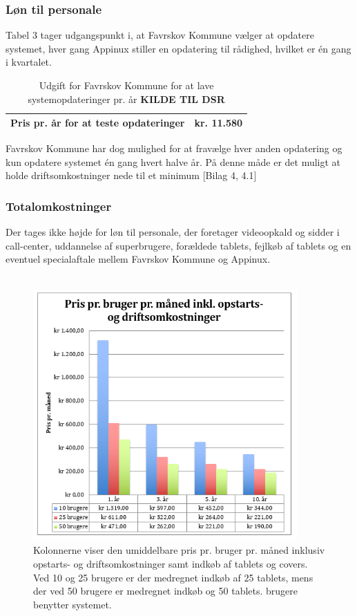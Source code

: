 \subsubsection{Løn til personale}
Tabel 3 tager udgangspunkt i, at Favrskov Kommune vælger at opdatere systemet, hver gang Appinux stiller en opdatering til rådighed, hvilket er én gang i kvartalet. 

\begin{table}[H]
	\caption{Udgift for Favrskov Kommune for at lave systemopdateringer pr. år \textbf{KILDE TIL DSR}}
	\centering
	\label{tab:tabelpersonaleudgift}
	\begin{tabularx}{\textwidth}{|X|X|}
		\hline
		Pris pr. år for at teste opdateringer
		& kr. 11.580\\ 
		\hline
	\end{tabularx}
\end{table}
Favrskov Kommune har dog mulighed for at fravælge hver anden opdatering og kun opdatere systemet én gang hvert halve år. På denne måde er det muligt at holde driftsomkostninger nede til et minimum [Bilag 4, 4.1]

\subsubsection{Totalomkostninger}
Der tages ikke højde for løn til personale, der foretager videoopkald og sidder i call-center, uddannelse af superbrugere, forældede tablets, fejlkøb af tablets og en eventuel specialaftale mellem Favrskov Kommune og Appinux.\\ \\

\begin{figure}[H]
	\centering
	\includegraphics[width=0.9\textwidth]{Figurer/figuroko.png}
	\caption{\label{fig:oekokort}Kolonnerne viser den umiddelbare pris pr. bruger pr. måned inklusiv opstarts- og driftsomkostninger samt indkøb af tablets og covers.
		Ved 10 og 25 brugere er der medregnet indkøb af 25 tablets, mens der ved 50 brugere er medregnet indkøb og 50 tablets. brugere benytter systemet.}
\end{figure}

